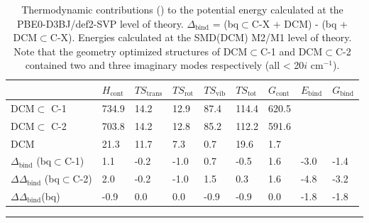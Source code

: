 \documentclass[../../main.tex]{subfiles}
\begin{document}
\begin{table}[h!]
	\def\arraystretch{1.7}
	\begin{tabularx}{\textwidth}{YYYYYYYYY}
		\hline	
		&$H_\text{cont}$&	$TS_\text{trans}$	&$TS_\text{rot}	$&$TS_\text{vib}$&	$TS_\text{tot}$&$G_\text{cont}$  & $E_\text{bind}$ & $G_\text{bind}$  \\
		\hline
		
		{\small{DCM$\subset$
				C-1}}	&	734.9&	14.2&	12.9&	87.4&	114.4&	620.5	&&	
\\
		{\small{DCM$\subset$
				C-2}}		&	703.8&	14.2&	12.8&	85.2&	112.2&	591.6	&&	
\\
		{\small{DCM}}	                         & 21.3		&	11.7&	7.3	&0.7&	19.6&	1.7	&&	
\\
		{\small{$\Delta_\text{bind}$
				(bq$\subset$C-1)}}&	1.1	&-0.2	&-1.0&	0.7	&-0.5&	1.6  &	-3.0&	-1.4
\\
		{\small{$\Delta\Delta_\text{bind}$ 
				(bq$\subset$C-2)}}&	2.0	&-0.2&	-1.0&	1.5&	0.3&	1.6	&-4.8&	-3.2
\\
		{\small{$\Delta\Delta_\text{bind}$(bq)}}&		-0.9&	0.0	&0.0&	-0.9&	-0.9&	0.0&	-1.8&	-1.8
	
		
	\end{tabularx}
	\hrule
	\vspace{0.2cm}
	\caption{Thermodynamic contributions (\kcal) to the potential energy calculated at the PBE0-D3BJ/def2-SVP level of theory. $\Delta_\text{bind}$ = (bq$\subset$C-X + DCM) - (bq + DCM$\subset$C-X). Energies calculated at the SMD(DCM) M2/M1 level of theory. Note that the geometry optimized structures of DCM$\subset$C-1 and DCM$\subset$C-2 contained two and three imaginary modes respectively (all < 20$i$ cm$^{-1}$). }
	\label{table::si_da_7}
\end{table}
\end{document}
